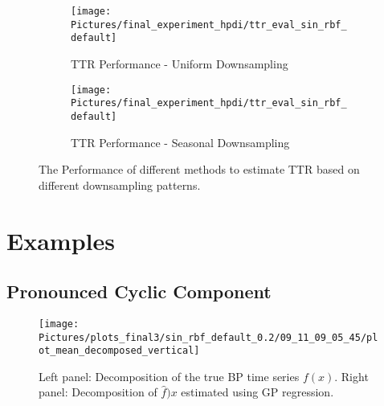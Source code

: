 \begin{figure}[!ht]
\centering
\begin{subfigure}{\textwidth}
    \centering
    \texttt{[image: Pictures/final\_experiment\_hpdi/ttr\_eval\_sin\_rbf\_default]}
    \caption{TTR Performance - Uniform Downsampling}
    \label{fig:ttr-uniform-sampling-performance}
\end{subfigure}

\bigskip

\begin{subfigure}{\textwidth}
    \centering
    \texttt{[image: Pictures/final\_experiment\_hpdi/ttr\_eval\_sin\_rbf\_default]}
    \caption{TTR Performance - Seasonal Downsampling}
    \label{fig:ttr-seasonal-sampling-performance}
\end{subfigure}
\caption[TTR Performance]{The Performance of different methods to
estimate TTR based on different downsampling patterns.
}
\label{fig:ttr-performance}
\end{figure}





\section{Examples}


\subsection{Pronounced Cyclic Component}

\begin{figure}[!ht]
\centering
    \texttt{[image: Pictures/plots\_final3/sin\_rbf\_default\_0.2/09\_11\_09\_05\_45/plot\_mean\_decomposed\_vertical]}
\caption[Decomposed BP time sereis]{Left panel: Decomposition of the true BP time series $f(x)$. Right panel:
Decomposition of $\hat{f})x$ estimated using GP regression.}
\label{fig:ex1-gp-prediction}
\end{figure}


